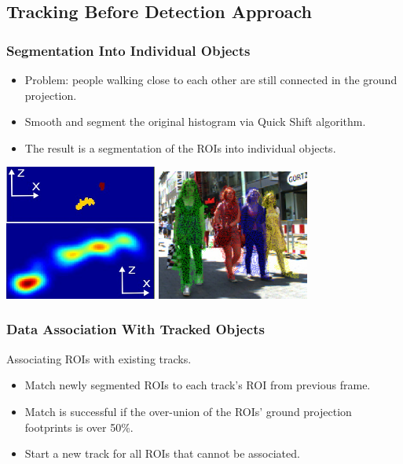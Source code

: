\documentclass{beamer}
\begin{document}
\subsection{Tracking Before Detection Approach}
\begin{frame}
\frametitle{Segmentation Into Individual Objects} 


  \begin{itemize}
  	\item Problem: people walking close to each other are still connected in the ground projection.
  	\item Smooth and segment the original histogram via Quick Shift algorithm.
  	\item The result is a segmentation of the ROIs into individual objects.
  \end{itemize}
\begin{center}
  \includegraphics[width=5cm]{histogram.jpg}
  \includegraphics[width=5cm]{image-045.jpg}
  \end{center}
\end{frame}

\begin{frame}
\frametitle{Data Association With Tracked Objects} 

Associating ROIs with existing tracks.
\begin{itemize}
  \item Match newly segmented ROIs to each track's ROI from previous frame.
  \item Match is successful if the over-union of the ROIs' ground projection footprints is over 50\%.
  \item Start a new track for all ROIs that cannot be associated.
\end{itemize}
\end{frame}
\end{document}
